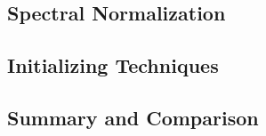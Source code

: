 \subsection{Spectral Normalization}
\label{sec:spectral_normalization}

\subsection{Initializing Techniques}
\label{sec:initializing_techniques}

\subsection{Summary and Comparison}
\label{sec:regularizers_summary}